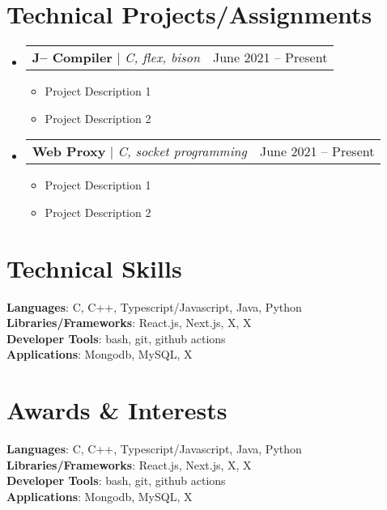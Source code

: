 \documentclass[letterpaper,11pt]{article}
\makeatletter
\newcommand{\resumeItem}[1]{
  \item\small{
    {#1 \vspace{-2pt}}
  }
}
\newcommand{\resumeProjectHeading}[2]{
    \item
    \begin{tabular*}{0.97\textwidth}{l@{\extracolsep{\fill}}r}
      \small#1 & #2 \\
    \end{tabular*}\vspace{-7pt}
}
\newcommand{\resumeSubHeadingListStart}{\begin{itemize}[leftmargin=0.15in, label={}]}
\newcommand{\resumeSubHeadingListEnd}{\end{itemize}}
\newcommand{\resumeItemListStart}{\begin{itemize}}
\newcommand{\resumeItemListEnd}{\end{itemize}\vspace{-5pt}}
\makeatother
\begin{document}
\section{Technical Projects/Assignments}

\resumeSubHeadingListStart
\resumeProjectHeading
{\textbf{J-- Compiler} $|$ \emph{C, flex, bison}}{June 2021 -- Present}
\resumeItemListStart
\resumeItem{Project Description 1}
\resumeItem{Project Description 2}
\resumeItemListEnd

\resumeProjectHeading
{\textbf{Web Proxy} $|$ \emph{C, socket programming}}{June 2021 -- Present}
\resumeItemListStart
\resumeItem{Project Description 1}
\resumeItem{Project Description 2}
\resumeItemListEnd


\resumeSubHeadingListEnd


\section{Technical Skills}
\begin{itemize}[leftmargin=0.15in, label={}]
  \small{\item{
        \textbf{Languages}{: C, C++, Typescript/Javascript, Java, Python} \\
        \textbf{Libraries/Frameworks}{: React.js, Next.js, X, X} \\
        \textbf{Developer Tools}{: bash, git, github actions} \\
        \textbf{Applications}{: Mongodb, MySQL, X}
        }}
\end{itemize}


\section{Awards \& Interests}

\begin{itemize}[leftmargin=0.15in, label={}]
  \small{\item{
        \textbf{Languages}{: C, C++, Typescript/Javascript, Java, Python} \\
        \textbf{Libraries/Frameworks}{: React.js, Next.js, X, X} \\
        \textbf{Developer Tools}{: bash, git, github actions} \\
        \textbf{Applications}{: Mongodb, MySQL, X}
        }}
\end{itemize}
\end{document}
